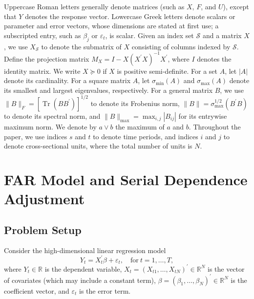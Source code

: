 ﻿\documentclass[12pt]{article}
\newcommand{\0}{\mbox{\bf 0}}
\theoremstyle{plain}%
\theoremstyle{definition}
\DeclareMathOperator{\Tr}{Tr}
\begin{document}
{\color{minorrevisionred}Uppercase Roman letters generally denote matrices
(such as $X$, $F$, and $U$), except that $Y$ denotes the response vector.
Lowercase Greek letters denote scalars or parameter and error vectors, whose
dimensions are stated at first use; a subscripted entry, such as $\beta_j$ or
$\varepsilon_t$, is scalar.}
Given an index set $\mathcal{S}$ and a matrix $X$, we use $X_{\mathcal{S}}$ to denote the submatrix of $X$ consisting of columns indexed by $\mathcal{S}$. Define the projection matrix $M_{X} = I - X(X^{\prime}X)^{-1}X^{\prime}$, where $I$ denotes the identity matrix. We write $X \succeq 0$ if $X$ is positive semi-definite. For a set $A$, let $|A|$ denote its cardinality. For a square matrix $A$, let $\sigma_{\min}(A)$ and $\sigma_{\max}(A)$ denote its smallest and largest eigenvalues, respectively. For a general matrix $B$, we use $\|B\|_{F} = \left[\Tr(BB^{\prime})\right]^{1/2}$ to denote its Frobenius norm, $\|B\| = \sigma_{\max}^{1/2}(B^{\prime}B)$ to denote its spectral norm, and $\|B\|_{\max} = \max_{i,j} |B_{ij}|$ for its entrywise maximum norm. We denote by $a \vee b$ the maximum of $a$ and $b$. Throughout the paper, we use indices $s$ and $t$ to denote time periods, and indices $i$ and $j$ to denote cross-sectional units, where the total number of units is $N$.





\section{FAR Model and Serial Dependence Adjustment}
\label{sec:FAR}



\subsection{Problem Setup}


Consider the high-dimensional linear regression model
\begin{equation}
Y_t = X_t^{\prime} \beta + \varepsilon_t, \quad \text{for} \ t = 1, \ldots, T, \label{m1}
\end{equation}
where $Y_t \in \mathbb{R}$ is the dependent variable, $X_t = (X_{t1}, \ldots, X_{tN})^{\prime} \in \mathbb{R}^N$ is the vector of covariates (which may include a constant term), $\beta = (\beta_1, \ldots, \beta_N)^{\prime} \in \mathbb{R}^N$ is the coefficient vector, and $\varepsilon_t$ is the error term. 
\end{document}
